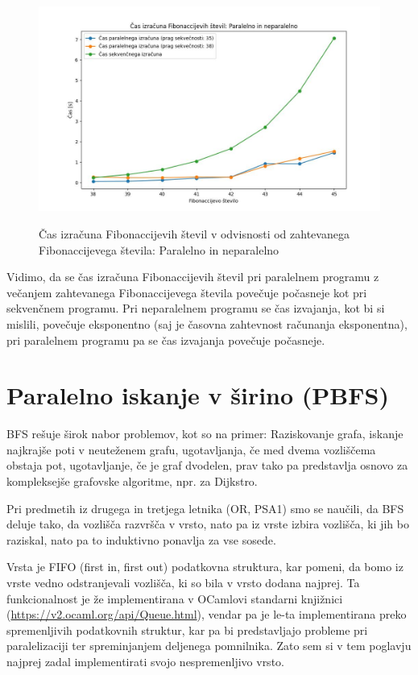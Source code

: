 \documentclass[mat1, tisk]{fmfdelo}
\begin{document}
\begin{figure}[h!]
  \centering
  \caption{Čas izračuna Fibonaccijevih števil v odvisnosti od zahtevanega Fibonaccijevega števila: Paralelno in neparalelno}
  \includegraphics[width=15cm]{slike/fib_par_v_odvisnosti_od_n.jpg}
  \label{fig:fib_par_v_odvisnosti_od_n}
\end{figure}

Vidimo, da se čas izračuna Fibonaccijevih števil pri paralelnem programu z večanjem zahtevanega Fibonaccijevega števila
povečuje počasneje kot pri sekvenčnem programu. Pri neparalelnem programu se čas izvajanja, kot bi
si mislili, povečuje eksponentno (saj je časovna zahtevnost računanja eksponentna), pri paralelnem programu pa se čas
izvajanja povečuje počasneje.

\section{Paralelno iskanje v širino (PBFS)}

BFS rešuje širok nabor problemov, kot so na primer: Raziskovanje grafa, iskanje najkrajše poti v neuteženem grafu, 
ugotavljanja, če med dvema vozliščema obstaja pot, ugotavljanje, če je graf dvodelen, prav tako pa predstavlja osnovo
za kompleksejše grafovske algoritme, npr. za Dijkstro.

Pri predmetih iz drugega in tretjega letnika (OR, PSA1) smo se naučili, da BFS deluje tako, da vozlišča razvršča
v vrsto, nato pa iz vrste izbira vozlišča, ki jih bo raziskal, nato pa to induktivno ponavlja za vse sosede.

Vrsta je FIFO (first in, first out) podatkovna struktura, kar pomeni, da bomo iz vrste vedno odstranjevali vozlišča, 
ki so bila v vrsto dodana najprej. Ta funkcionalnost je že implementirana v OCamlovi standarni knjižnici
(\url{https://v2.ocaml.org/api/Queue.html}), vendar pa je le-ta implementirana preko spremenljivih podatkovnih struktur,
kar pa bi predstavljajo probleme pri paralelizaciji ter spreminjanjem deljenega pomnilnika. Zato sem si v tem poglavju
najprej zadal implementirati svojo nespremenljivo vrsto.
\end{document}
